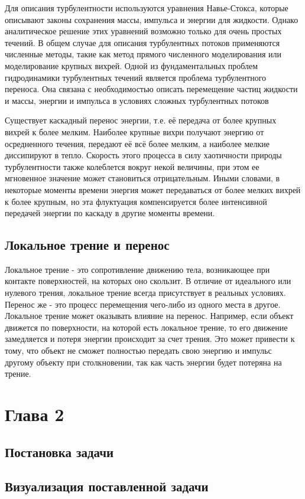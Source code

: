 \documentclass[a4paper]{article}
\newcommand{\numsection}[1]{\section*{#1}\addcontentsline{toc}{section}{#1} \refstepcounter{section}}
\begin{document}
		Для описания турбулентности используются уравнения Навье-Стокса, которые описывают законы сохранения массы, импульса и энергии для жидкости. Однако аналитическое решение этих уравнений возможно только для очень простых течений. В общем случае для описания турбулентных потоков применяются численные методы, такие как метод прямого численного моделирования или моделирование крупных вихрей. Одной из фундаментальных проблем гидродинамики турбулентных течений является проблема турбулентного переноса. Она связана с необходимостью описать перемещение частиц жидкости и массы, энергии и импульса в условиях сложных турбулентных потоков
		
		Существует каскадный перенос энергии, т.е. её передача от более крупных вихрей к более мелким. Наиболее крупные вихри получают энергию от осредненного течения, передают её всё более мелким, а наиболее мелкие диссипируют в тепло. Скорость этого процесса в силу хаотичности природы турбулентности также колеблется вокруг некой величины, при этом ее мгновенное значение может становиться отрицательным. Иными словами, в некоторые моменты времени энергия может передаваться от более мелких вихрей к более крупным, но эта флуктуация компенсируется более интенсивной передачей энергии по каскаду в другие моменты времени.
		
		
	\subsection{Локальное трение и перенос}
	
		Локальное трение - это сопротивление движению тела, возникающее при контакте поверхностей, на которых оно скользит. В отличие от идеального или нулевого трения, локальное трение всегда присутствует в реальных условиях. Перенос же - это процесс перемещения чего-либо из одного места в другое. Локальное трение может оказывать влияние на перенос. Например, если объект движется по поверхности, на которой есть локальное трение, то его движение замедляется и потеря энергии происходит за счет трения. Это может привести к тому, что объект не сможет полностью передать свою энергию и импульс другому объекту при столкновении, так как часть энергии будет потеряна на трение.
	
	\numsection{Глава 2}
	\subsection{Постановка задачи}
	\subsection{Визуализация поставленной задачи}
\end{document}
